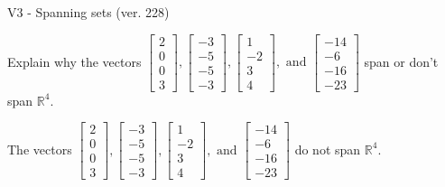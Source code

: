 \begin{exercise}
  \begin{exerciseTitle}V3 - Spanning sets (ver. 228)\end{exerciseTitle}
  \begin{exerciseStatement}
    Explain why the vectors \(\left[\begin{array}{r}
2 \\
0 \\
0 \\
3
\end{array}\right] , \left[\begin{array}{r}
-3 \\
-5 \\
-5 \\
-3
\end{array}\right] , \left[\begin{array}{r}
1 \\
-2 \\
3 \\
4
\end{array}\right] , \text{ and } \left[\begin{array}{r}
-14 \\
-6 \\
-16 \\
-23
\end{array}\right]\) span or don't span \(\mathbb{R}^4\). 
	


  \end{exerciseStatement}
  \begin{exerciseAnswer}
   The vectors \(\left[\begin{array}{r}
2 \\
0 \\
0 \\
3
\end{array}\right] , \left[\begin{array}{r}
-3 \\
-5 \\
-5 \\
-3
\end{array}\right] , \left[\begin{array}{r}
1 \\
-2 \\
3 \\
4
\end{array}\right] , \text{ and } \left[\begin{array}{r}
-14 \\
-6 \\
-16 \\
-23
\end{array}\right]\) 
  	 do not  
	span \(\mathbb{R}^4\).
  


  \end{exerciseAnswer}
\end{exercise}